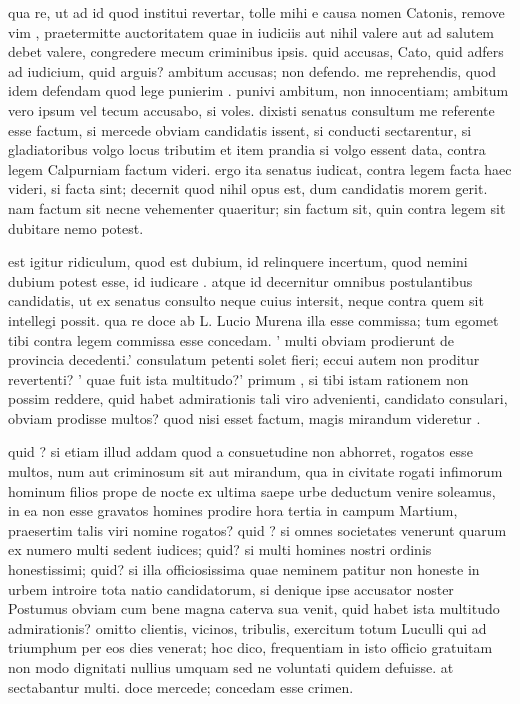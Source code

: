  qua re, ut ad id quod institui revertar, tolle mihi e causa nomen Catonis, remove vim , praetermitte auctoritatem quae in iudiciis aut nihil valere aut ad salutem debet valere, congredere mecum criminibus ipsis. quid accusas, Cato, quid adfers ad iudicium, quid arguis? ambitum accusas; non defendo. me reprehendis, quod idem defendam quod lege punierim . punivi ambitum, non innocentiam; ambitum vero ipsum vel tecum accusabo, si voles. dixisti senatus consultum me referente esse factum, si mercede obviam candidatis issent, si conducti sectarentur, si gladiatoribus volgo locus tributim et item prandia si volgo essent data, contra legem Calpurniam factum videri. ergo ita senatus iudicat, contra legem facta haec videri, si facta sint; decernit quod nihil opus est, dum candidatis morem gerit. nam factum sit necne vehementer quaeritur; sin factum sit, quin contra legem sit dubitare nemo potest.

 est igitur ridiculum, quod est dubium, id relinquere incertum, quod nemini dubium potest esse, id iudicare . atque id decernitur omnibus postulantibus candidatis, ut ex senatus consulto neque cuius intersit, neque contra quem sit intellegi possit. qua re doce ab L. Lucio Murena illa esse commissa; tum egomet tibi contra legem commissa esse concedam. ' multi obviam prodierunt de provincia decedenti.' consulatum petenti solet fieri; eccui autem non proditur revertenti? ' quae fuit ista multitudo?' primum , si tibi istam rationem non possim reddere, quid habet admirationis tali viro advenienti, candidato consulari, obviam prodisse multos? quod nisi esset factum, magis mirandum videretur .

 quid ? si etiam illud addam quod a consuetudine non abhorret, rogatos esse multos, num aut criminosum sit aut mirandum, qua in civitate rogati infimorum hominum filios prope de nocte ex ultima saepe urbe deductum venire soleamus, in ea non esse gravatos homines prodire hora tertia in campum Martium, praesertim talis viri nomine rogatos? quid ? si omnes societates venerunt quarum ex numero multi sedent iudices; quid? si multi homines nostri ordinis honestissimi; quid? si illa officiosissima quae neminem patitur non honeste in urbem introire tota natio candidatorum, si denique ipse accusator noster Postumus obviam cum bene magna caterva sua venit, quid habet ista multitudo admirationis? omitto clientis, vicinos, tribulis, exercitum totum Luculli qui ad triumphum per eos dies venerat; hoc dico, frequentiam in isto officio gratuitam non modo dignitati nullius umquam sed ne voluntati quidem defuisse. at sectabantur multi. doce mercede; concedam esse crimen.

